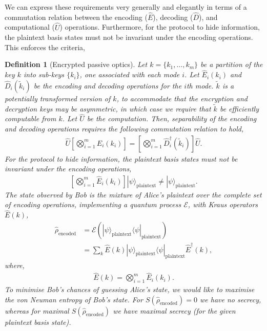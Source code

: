 \documentclass[aps,rmp,twocolumn,amsmath,amssymb,nofootinbib,superscriptaddress,longbibliography,floatfix,table-of-contents,eqsecnum]{revtex4-1}
\newcommand{\bra}[1]{\langle#1|}
\newcommand{\ket}[1]{|#1\rangle}
\newtheorem{definition}{Definition}
\begin{document}
We can express these requirements very generally and elegantly in terms of a commutation relation between the encoding ($\hat{E}$), decoding ($\hat{D}$), and computational ($\hat{U}$) operations. Furthermore, for the protocol to hide information, the plaintext basis states must not be invariant under the encoding operations. This enforces the criteria,
\begin{definition}[Encrypted passive optics] \label{def:enc_pass}
Let \mbox{$k=\{k_1,\dots,k_m\}$} be a partition of the key $k$ into sub-keys $\{k_i\}$, one associated with each mode $i$. Let $\hat{E}_i(k_i)$ and $\hat{D}_i(\tilde k_i)$ be the encoding and decoding operations for the $i$th mode. $\tilde k$ is a potentially transformed version of $k$, to accommodate that the encryption and decryption keys may be asymmetric, in which case we require that $\tilde{k}$ be efficiently computable from $k$. Let $\hat{U}$ be the computation. Then, separability of the encoding and decoding operations requires the following commutation relation to hold,
\begin{align} \label{eq:gen_pass_hom}
\hat{U} \left[\bigotimes_{i=1}^m\hat{E}_i(k_i)\right] = \left[\bigotimes_{i=1}^m\hat{D}^\dag_i(\tilde k_i)\right] \hat{U}.
\end{align}
For the protocol to hide information, the plaintext basis states must not be invariant under the encoding operations,
\begin{align}
\left[\bigotimes_{i=1}^m\hat{E}_i(k_i)\right]\ket\psi_\text{plaintext} \neq \ket\psi_\mathrm{plaintext}.
\end{align}
The state observed by Bob is the mixture of Alice's plaintext over the complete set of encoding operations, implementing a quantum process $\mathcal{E}$, with Kraus operators $\hat{E}(k)$,
\begin{align} \label{eq:mix_over_enc_ops}
\hat\rho_\text{encoded} &= \mathcal{E}(\ket\psi_\mathrm{plaintext}\bra\psi_\mathrm{plaintext}) \nonumber \\
&= \sum_k \hat{E}(k)\ket\psi_\mathrm{plaintext}\bra\psi_\mathrm{plaintext} \hat{E}^\dag(k),
\end{align}
where,
\begin{align}
\hat{E}(k) = \bigotimes_{i=1}^m\hat{E}_i(k_i).
\end{align}
To minimise Bob's chances of guessing Alice's state, we would like to maximise the von Neuman entropy of Bob's state. For \mbox{$S(\hat\rho_\mathrm{encoded})=0$} we have no secrecy, whereas for maximal \mbox{$S(\hat\rho_\mathrm{encoded})$} we have maximal secrecy (for the given plaintext basis state).
\end{definition} 
\end{document}
